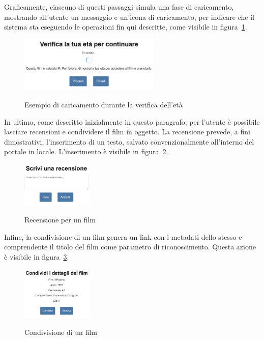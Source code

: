Graficamente, ciascuno di questi passaggi simula una fase di caricamento, mostrando all'utente un messaggio e un'icona di caricamento, per indicare che il sistema sta eseguendo
le operazioni fin qui descritte, come visibile in figura~\ref{fig:verifica-eta-corso}.

\begin{figure}[ht]
    \centering
    \includegraphics[width=0.6\textwidth, alt={Finestra visualizzata di caricamento durante la verifica dell'età}]{immagini/frontend/verification-doing.png}
    \caption{Esempio di caricamento durante la verifica dell'età}\label{fig:verifica-eta-corso}
\end{figure}

\newpage 

In ultimo, come descritto inizialmente in questo paragrafo, per l'utente è possibile lasciare recensioni e condividere il film in oggetto.
La recensione prevede, a fini dimostrativi, l'inserimento di un testo, salvato convenzionalmente all'interno del portale in locale.
L'inserimento è visibile in figura~\ref{fig:recensione-film}.

\begin{figure}[ht]
    \centering
    \includegraphics[width=0.3\textwidth, alt={Schermata di inserimento di una recensione per un film}]{immagini/frontend/review.png}
    \caption{Recensione per un film}\label{fig:recensione-film}
\end{figure}

Infine, la condivisione di un film genera un link con i metadati dello stesso e comprendente il titolo del film come parametro di riconoscimento.
Questa azione è visibile in figura~\ref{fig:condivisione-film}.

\begin{figure}[ht]
    \centering
    \includegraphics[width=0.3\textwidth, alt={Schermata di condivisione di un film}]{immagini/frontend/share.png}
    \caption{Condivisione di un film}\label{fig:condivisione-film}
\end{figure}

